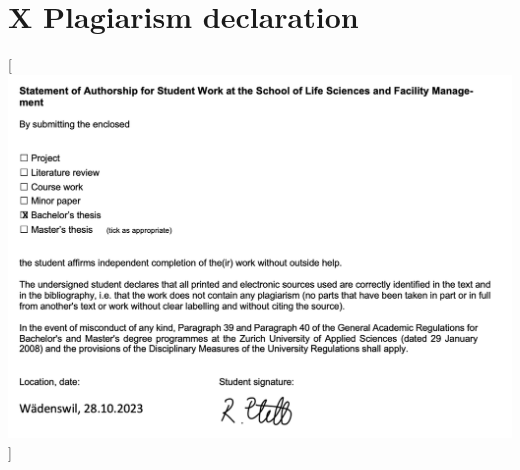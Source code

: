\documentclass[
  letterpaper,
  DIV=11,
  numbers=noendperiod]{scrreprt}
\begin{document}
\newpage

\hypertarget{sec-annex_x}{%
\section*{\texorpdfstring{\textsc{X} Plagiarism
declaration}{ Plagiarism declaration}}\label{sec-annex_x}}


\color{white}

{[}\includegraphics[width=1\textwidth,height=\textheight]{text/annex_files/plagiarism_declaration.png}{]}
\normalcolor \newpage
\end{document}
